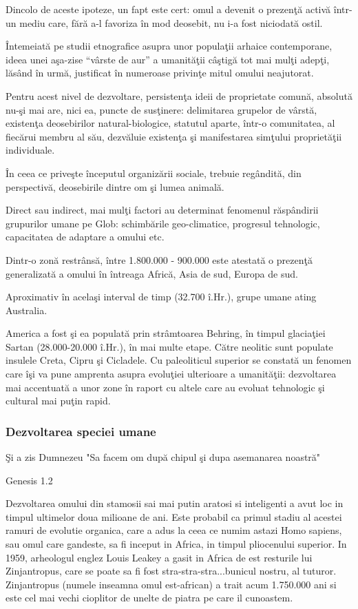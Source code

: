 Dincolo de aceste ipoteze, un fapt este cert: omul a devenit o prezenţă activă într-un mediu  care, fără a-l favoriza în mod deosebit, nu i-a fost niciodată ostil.

Întemeiată pe studii etnografice asupra unor populaţii arhaice contemporane, ideea unei aşa-zise “vârste de aur” a umanităţii câştigă tot mai mulţi adepţi, lăsând în urmă, justificat în numeroase privinţe mitul omului neajutorat.

Pentru acest nivel de dezvoltare, persistenţa ideii de proprietate comună, absolută nu-şi mai are, nici ea, puncte de susţinere: delimitarea grupelor de vârstă, existenţa deosebirilor natural-biologice, statutul aparte, într-o comunitatea, al fiecărui membru al său, dezvăluie existenţa şi manifestarea simţului proprietăţii individuale.

În ceea ce priveşte începutul organizării sociale, trebuie regândită, din perspectivă, deosebirile dintre om şi lumea animală.

Direct sau indirect, mai mulţi factori au determinat fenomenul  răspândirii grupurilor umane pe Glob: schimbările geo-climatice, progresul tehnologic, capacitatea de adaptare a omului etc.

Dintr-o zonă restrânsă, între 1.800.000 - 900.000 este atestată o prezenţă generalizată a omului în întreaga Africă, Asia de sud, Europa de sud.

Aproximativ în acelaşi interval de timp (32.700 î.Hr.), grupe umane ating Australia.

America a fost şi ea populată prin strâmtoarea Behring, în timpul glaciaţiei Sartan (28.000-20.000 î.Hr.), în mai multe etape. Către neolitic sunt populate insulele Creta, Cipru şi Cicladele. Cu paleoliticul superior se constată un fenomen care îşi va pune amprenta asupra evoluţiei ulterioare a umanităţii: dezvoltarea mai accentuată a unor zone în raport cu altele care au evoluat tehnologic şi cultural mai puţin rapid.
\subsubsection{Dezvoltarea speciei umane}

\epigraph{Şi a zis Dumnezeu "Sa facem om după chipul şi dupa asemanarea noastră"}{Genesis 1.2}
Dezvoltarea omului din stamosii sai mai putin aratosi si inteligenti a avut loc in timpul ultimelor doua milioane de ani. Este probabil ca primul stadiu al acestei ramuri de evolutie organica, care a adus la ceea ce numim astazi Homo sapiens, sau omul care gandeste, sa fi inceput in Africa, in timpul pliocenului superior. In 1959, arheologul englez Louis Leakey a gasit in Africa de est resturile lui Zinjantropus, care se poate sa fi fost stra-stra-stra...bunicul nostru, al tuturor. Zinjantropus (numele inseamna omul est-african) a trait acum 1.750.000 ani si este cel mai vechi cioplitor de unelte de piatra pe care il cunoastem.

